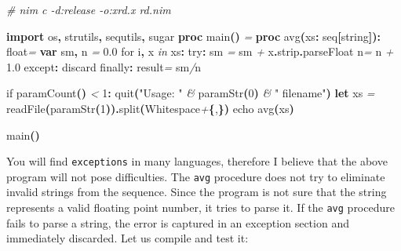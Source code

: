 \documentclass[
  12pt,
]{book}
\newenvironment{Shaded}{}{}
\newcommand{\CharTok}[1]{\textcolor[rgb]{0.25,0.44,0.63}{#1}}
\newcommand{\CommentTok}[1]{\textcolor[rgb]{0.38,0.63,0.69}{\textit{#1}}}
\newcommand{\DataTypeTok}[1]{\textcolor[rgb]{0.56,0.13,0.00}{#1}}
\newcommand{\DecValTok}[1]{\textcolor[rgb]{0.25,0.63,0.44}{#1}}
\newcommand{\FloatTok}[1]{\textcolor[rgb]{0.25,0.63,0.44}{#1}}
\newcommand{\KeywordTok}[1]{\textcolor[rgb]{0.00,0.44,0.13}{\textbf{#1}}}
\newcommand{\NormalTok}[1]{#1}
\newcommand{\OtherTok}[1]{\textcolor[rgb]{0.00,0.44,0.13}{#1}}
\newcommand{\StringTok}[1]{\textcolor[rgb]{0.25,0.44,0.63}{#1}}
\begin{document}
\begin{Shaded}
\begin{Highlighting}[]
\CommentTok{\# nim c {-}d:release {-}o:xrd.x rd.nim}

\KeywordTok{import}\NormalTok{ os}\KeywordTok{,}\NormalTok{ strutils}\KeywordTok{,}\NormalTok{ sequtils}\KeywordTok{,}\NormalTok{ sugar}
\KeywordTok{proc }\StringTok{main}\KeywordTok{()} \CommentTok{=}
  \KeywordTok{proc }\StringTok{avg}\KeywordTok{(}\NormalTok{xs}\KeywordTok{:} \DataTypeTok{seq}\KeywordTok{[}\DataTypeTok{string}\KeywordTok{]):} \DataTypeTok{float}\CommentTok{=}
     \KeywordTok{var}\NormalTok{ sm}\KeywordTok{,}\NormalTok{ n }\CommentTok{=} \DecValTok{0}\FloatTok{.}\DecValTok{0}
     \DataTypeTok{for}\NormalTok{ i}\KeywordTok{,}\NormalTok{ x }\CommentTok{in}\NormalTok{ xs}\KeywordTok{:}
       \DataTypeTok{try}\KeywordTok{:}
\NormalTok{          sm }\CommentTok{=}\NormalTok{ sm }\CommentTok{+}\NormalTok{ x}\KeywordTok{.}\DataTypeTok{strip}\KeywordTok{.}\DataTypeTok{parseFloat}
\NormalTok{          n}\CommentTok{=}\NormalTok{ n }\CommentTok{+} \DecValTok{1}\FloatTok{.}\DecValTok{0}
       \DataTypeTok{except}\KeywordTok{:} \DataTypeTok{discard}
       \DataTypeTok{finally}\KeywordTok{:} \OtherTok{result}\CommentTok{=}\NormalTok{ sm}\CommentTok{/}\NormalTok{n}

  \DataTypeTok{if} \DataTypeTok{paramCount}\KeywordTok{()} \CommentTok{\textless{}} \DecValTok{1}\KeywordTok{:} \DataTypeTok{quit}\KeywordTok{(}\StringTok{"Usage: "} \CommentTok{\&} \DataTypeTok{paramStr}\KeywordTok{(}\DecValTok{0}\KeywordTok{)} \CommentTok{\&} \StringTok{" filename"}\KeywordTok{)}
  \KeywordTok{let}\NormalTok{ xs }\CommentTok{=} \DataTypeTok{readFile}\KeywordTok{(}\DataTypeTok{paramStr}\KeywordTok{(}\DecValTok{1}\KeywordTok{)).}\DataTypeTok{split}\KeywordTok{(}\DataTypeTok{Whitespace}\CommentTok{+}\KeywordTok{\{}\CharTok{\textquotesingle{},\textquotesingle{}}\KeywordTok{\})}
  \DataTypeTok{echo} \DataTypeTok{avg}\KeywordTok{(}\NormalTok{xs}\KeywordTok{)}

\DataTypeTok{main}\KeywordTok{()}
\end{Highlighting}
\end{Shaded}

You will find \texttt{exceptions} in many languages, therefore I believe
that the above program will not pose difficulties. The \texttt{avg}
procedure does not try to eliminate invalid strings from the sequence.
Since the program is not sure that the string represents a valid
floating point number, it tries to parse it. If the \texttt{avg}
procedure fails to parse a string, the error is captured in an exception
section and immediately discarded. Let us compile and test it:
\end{document}
